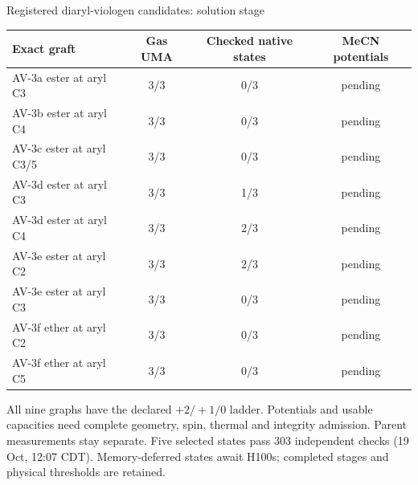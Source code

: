 \begin{frame}{Registered diaryl-viologen candidates: solution stage}
\scriptsize\centering\renewcommand{\arraystretch}{1.1}
\begin{tabular}{@{}lccc@{}}\toprule
Exact graft & Gas UMA & Checked native states & MeCN potentials \\ \midrule
AV-3a ester at aryl C3 & 3/3 & 0/3 & pending \\
AV-3b ester at aryl C4 & 3/3 & 0/3 & pending \\
AV-3c ester at aryl C3/5 & 3/3 & 0/3 & pending \\
AV-3d ester at aryl C3 & 3/3 & 1/3 & pending \\
AV-3d ester at aryl C4 & 3/3 & 2/3 & pending \\
AV-3e ester at aryl C2 & 3/3 & 2/3 & pending \\
AV-3e ester at aryl C3 & 3/3 & 0/3 & pending \\
AV-3f ether at aryl C2 & 3/3 & 0/3 & pending \\
AV-3f ether at aryl C5 & 3/3 & 0/3 & pending \\
\bottomrule\end{tabular}\par\vspace{1.5ex}\raggedright
\footnotesize All nine graphs have the declared $+2/+1/0$ ladder.
Potentials and usable capacities need complete geometry, spin, thermal and
integrity admission. Parent measurements stay separate.
\vfill\scriptsize Five selected states pass 303 independent checks (19 Oct, 12:07 CDT).
Memory-deferred states await H100s; completed stages and physical thresholds are retained.
\end{frame}
